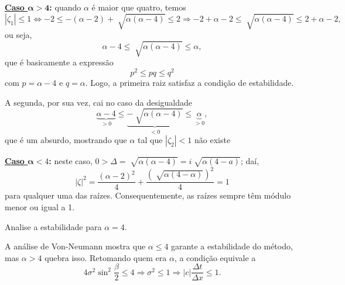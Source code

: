 \documentclass[../differential_methods.tex]{subfiles}
\begin{document}
\textbf{\underline{Caso \(\mathbf{\alpha >4}\)}:} quando \(\alpha \) é maior que quatro, temos
\[
	| \zeta_1 |\leq 1 \Longleftrightarrow  -2 \leq -(\alpha -2) + \sqrt[]{\alpha (\alpha -4)}\leq 2 \Rightarrow -2 + \alpha  - 2 \leq \sqrt[]{\alpha (\alpha -4)}\leq 2+\alpha -2,
\]
ou seja,
\[
	\alpha -4 \leq \sqrt[]{\alpha (\alpha -4)}\leq \alpha,
\]
que é basicamente a expressão
\[
	p^{2}\leq pq \leq q^{2}
\]
com \(p = \alpha -4\) e \(q=\alpha \). Logo, a primeira raiz satisfaz a condição de estabilidade.

A segunda, por sua vez, cai no caso da desigualdade
\[
	\underbrace{\alpha - 4}_{>0} \leq \underbrace{-\sqrt[]{\alpha (\alpha -4)}}_{<0} \leq \underbrace{\alpha}_{>0} ,
\]
que é um absurdo, mostrando que \(\alpha \) tal que \(| \zeta_2 | < 1\) não existe

\textbf{\underline{Caso \(\mathbf{\alpha }< 4\)}:} neste caso, \(0 > \Delta =\sqrt[]{\alpha (\alpha -4)} = i \sqrt[]{\alpha (4-a)}\); daí,
\[
	| \zeta  |^{2} = \frac{(\alpha -2)^{2}}{4} + \frac{(\sqrt[]{\alpha (4-\alpha )})^{2}}{4} = 1
\]
para qualquer uma das raízes. Consequentemente, as raízes sempre têm módulo menor ou igual a 1.

\begin{exr}
	Analise a estabilidade para \(\alpha =4\).
\end{exr}

A análise de Von-Neumann mostra que \(\alpha \leq 4\) garante a estabilidade do método, mas \(\alpha > 4\) quebra isso. Retomando quem era \(\alpha \), a condição equivale a
\[
	4\sigma^{2}\sin^{2}{\frac{\beta }{2}}\leq 4 \Rightarrow \sigma^{2}\leq 1 \Rightarrow | c |\frac{\Delta t}{\Delta x} \leq 1.
\]
\end{document}
